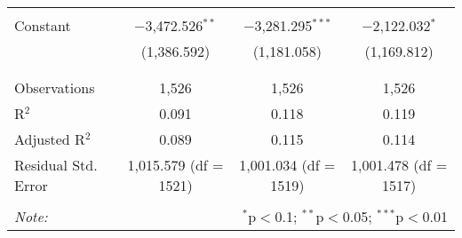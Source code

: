 \begin{table}[!htbp]
\begin{tabular}{@{\extracolsep{5pt}}lccc}
  & & & \\ 
 Constant & $-$3,472.526$^{**}$ & $-$3,281.295$^{***}$ & $-$2,122.032$^{*}$ \\ 
  & (1,386.592) & (1,181.058) & (1,169.812) \\ 
  & & & \\ 
\hline \\[-1.8ex] 
Observations & 1,526 & 1,526 & 1,526 \\ 
R$^{2}$ & 0.091 & 0.118 & 0.119 \\ 
Adjusted R$^{2}$ & 0.089 & 0.115 & 0.114 \\ 
Residual Std. Error & 1,015.579 (df = 1521) & 1,001.034 (df = 1519) & 1,001.478 (df = 1517) \\ 
\hline 
\hline \\[-1.8ex] 
\textit{Note:}  & \multicolumn{3}{r}{$^{*}$p$<$0.1; $^{**}$p$<$0.05; $^{***}$p$<$0.01} \\ 
\end{tabular} 
\end{table} 
